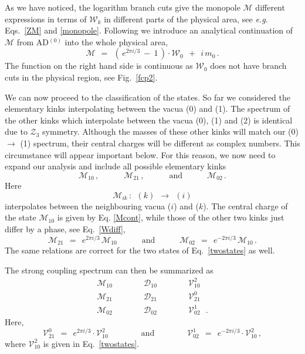 \documentclass[epsfig,12pt]{article}
\def\beq{\begin{equation}}
\def\eeq{\end{equation}}
\def\beq{\begin{equation}}
\def\eeq{\end{equation}}
\newcommand{\mc}[1]{\mathcal{#1}}
\newcommand{\W}{\mathcal{W}}
\newcommand{\M}{\mathcal{M}}
\newcommand{\D}{\mathcal{D}}
\newcommand{\V}{\mathcal{V}}
\begin{document}
	As we have noticed, the logarithm branch cuts give the monopole $ \M $ different expressions in terms
	of $ \W_k $ in different parts of the physical area, see {\it e.g.} Eqs.~\eqref{ZM} and \eqref{monopole}.
	Following \cite{Bolokhov:2011mp} we introduce an analytical continuation of $ \M $ from AD$^{(0)}$ into
	the whole physical area,
\beq
\label{Mcont}
	\M  ~~=~~  \left(\, e^{2 \pi i / 3} ~-~ 1 \,\right) \cdot \W_0  ~~+~~  i\, m_0\,.
\eeq
	The function on the right hand side is continuous as $ \W_0 $ does not have branch cuts in the physical 
	region, see Fig.~\ref{fcp2}.

	We can now proceed to the classification of the states.
	So far we considered the elementary kinks interpolating between
	the vacua ({\sc \small 0}) and ({\sc \small 1}).
	The spectrum of the other kinks which interpolate between the vacua ({\sc \small 0}), ({\sc \small 1}) and ({\sc \small 2})
	is identical due to $ \mc{Z}_3 $ symmetry.
	Although the masses of these other kinks will match our ({\sc \small 0}) $ \rightarrow $ ({\sc \small 1}) spectrum, 
	their central charges will be different as complex numbers.
	This circumstance will appear important below.
	For this reason, we now need to expand our analysis and include all possible elementary kinks
\beq
	\M_{10}\,,   \qquad\quad     \M_{21}\,,     \qquad\quad\text{and}\qquad\quad   \M_{02}\,.
\eeq
	Here
\beq
	\M_{ik} \,:  ~~  ({ \scriptstyle k }) ~~\longrightarrow~~ ({ \scriptstyle i })
\eeq
	interpolates between the neighbouring vacua ($ \scriptstyle i $) and ($ \scriptstyle k $).
	The central charge of the state $ \M_{10} $ is given by Eq. \eqref{Mcont}, while those
	of the other two kinks just differ by a phase, see Eq.~\eqref{Wdiff},
\beq
	\M_{21} ~~=~~ e^{2 \pi i / 3}\, \M_{10}  
	\qquad\quad \text{and} \qquad\quad 
	\M_{02} ~~=~~ e^{- 2 \pi i / 3}\, \M_{10}\,.
\eeq
	The same relations are correct for the two states of Eq.~\eqref{twostates} as well.

	The strong coupling spectrum can then be summarized as
\beq
\label{sspectrum}
	\begin{array}{ccc}
		\M_{10} \qquad\quad    &    \D_{10} \qquad\quad    &    \V_{10}^2    \phantom{~~~.}    \\[2mm]
		\M_{21} \qquad\quad    &    \D_{21} \qquad\quad    &    \V_{21}^0    \phantom{~~~.}    \\[2mm]
		\M_{02} \qquad\quad    &    \D_{02} \qquad\quad    &    \V_{02}^1    ~~~. 
	\end{array}
\eeq
	Here, 
\beq
	\V_{21}^0  ~~=~~  e^{2 \pi i / 3} \cdot \V_{10}^2 
	\qquad\qquad  \text{and}  \qquad\qquad
	\V_{02}^1  ~~=~~  e^{- 2 \pi i / 3} \cdot \V_{10}^2 \,,
\eeq
	where $ \V_{10}^2 $ is given in Eq.~\eqref{twostates}.
\end{document}
